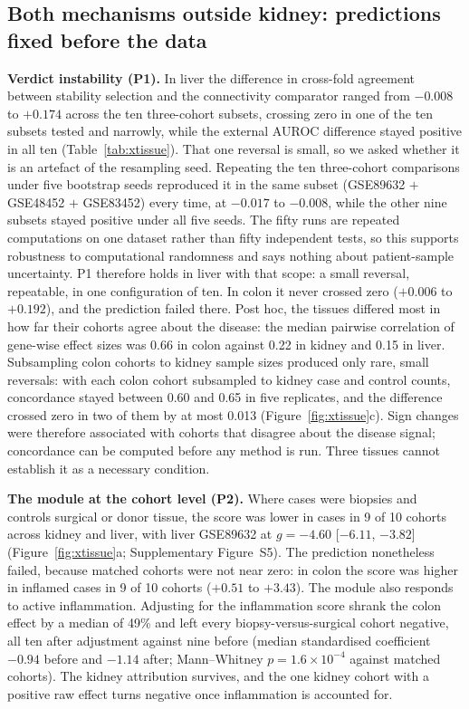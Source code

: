 \documentclass[unnumsec,webpdf,contemporary,large,numbered]{oup-authoring-template}
\begin{document}
\subsection{Both mechanisms outside kidney: predictions fixed before the data}\label{sec:xtissue}

\textbf{Verdict instability (P1).} In liver the difference in cross-fold agreement between
stability selection and the connectivity comparator ranged from $-0.008$ to $+0.174$ across the ten
three-cohort subsets, crossing zero in one of the ten subsets tested and narrowly, while the
external AUROC difference stayed positive in all ten (Table~\ref{tab:xtissue}). That one reversal
is small, so we asked whether it is an artefact of the resampling seed. Repeating the ten
three-cohort comparisons under five bootstrap seeds reproduced it in the same subset
(GSE89632 $+$ GSE48452 $+$ GSE83452) every time, at $-0.017$ to $-0.008$, while the other nine
subsets stayed positive under all five seeds. The fifty runs are repeated computations on one
dataset rather than fifty independent tests, so this supports robustness to computational
randomness and says nothing about patient-sample uncertainty. P1 therefore holds in liver with
that scope: a small reversal, repeatable, in one configuration of ten. In colon it never crossed zero ($+0.006$ to
$+0.192$), and the prediction failed there. Post hoc, the tissues differed most in how far their
cohorts agree about the disease: the median pairwise correlation of gene-wise effect sizes was 0.66
in colon against 0.22 in kidney and 0.15 in liver. Subsampling colon cohorts to kidney sample
sizes produced only rare, small reversals: with each colon cohort subsampled to kidney case and
control counts, concordance stayed between 0.60 and 0.65 in five replicates, and the difference
crossed zero in two of them by at most 0.013 (Figure~\ref{fig:xtissue}c). Sign changes were
therefore associated with cohorts that disagree about the disease signal; concordance can be
computed before any method is run. Three tissues cannot establish it as a necessary condition.

\textbf{The module at the cohort level (P2).} Where cases were biopsies and controls surgical or
donor tissue, the score was lower in cases in 9 of 10 cohorts across kidney and liver, with liver
GSE89632 at $g = -4.60$ [$-6.11$, $-3.82$] (Figure~\ref{fig:xtissue}a; Supplementary Figure~S5). The prediction nonetheless
failed, because matched cohorts were not near zero: in colon the score was higher in inflamed
cases in 9 of 10 cohorts ($+0.51$ to $+3.43$). The module also responds to active inflammation.
Adjusting for the inflammation score shrank the colon effect by a median of 49\% and left every
biopsy-versus-surgical cohort negative, all ten after adjustment against nine before (median
standardised coefficient $-0.94$ before and $-1.14$ after; Mann--Whitney $p = 1.6 \times 10^{-4}$
against matched cohorts). The kidney attribution survives, and the one kidney cohort with a
positive raw effect turns negative once inflammation is accounted for.
\end{document}
